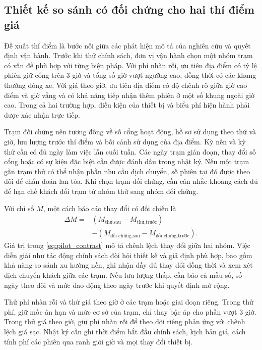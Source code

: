 \documentclass[conference,a4paper]{IEEEtran}
\begin{document}
\subsection{Thiết kế so sánh có đối chứng cho hai thí điểm giá}

Đề xuất thí điểm là bước nối giữa các phát hiện mô tả của nghiên cứu và quyết định vận hành. Trước khi thử chính sách, đơn vị vận hành chọn một nhóm trạm có vấn đề phù hợp với từng biện pháp. Với phí nhàn rỗi, ưu tiên địa điểm có tỷ lệ phiên giữ cổng trên 3 giờ và tổng số giờ vượt ngưỡng cao, đồng thời có các khung thường đông xe. Với giá theo giờ, ưu tiên địa điểm có độ chênh rõ giữa giờ cao điểm và giờ vắng và có khả năng tiếp nhận thêm phiên ở một số khung ngoài giờ cao. Trong cả hai trường hợp, điều kiện của thiết bị và biểu phí hiện hành phải được xác nhận trực tiếp.

Trạm đối chứng nên tương đồng về số cổng hoạt động, hồ sơ sử dụng theo thứ và giờ, lưu lượng trước thí điểm và bối cảnh sử dụng của địa điểm. Kỳ nền và kỳ thử cần có đủ ngày làm việc lẫn cuối tuần. Các ngày trạm gián đoạn, thay đổi số cổng hoặc có sự kiện đặc biệt cần được đánh dấu trong nhật ký. Nếu một trạm gần trạm thử có thể nhận phần nhu cầu dịch chuyển, số phiên tại đó được theo dõi để chẩn đoán lan tỏa. Khi chọn trạm đối chứng, cần cân nhắc khoảng cách đủ để hạn chế khách đổi trạm từ nhóm thử sang nhóm đối chứng.

Với chỉ số $M$, một cách báo cáo thay đổi có đối chiếu là
\begin{equation}
\begin{aligned}
\Delta M={}&(M_{\text{thử,sau}}-M_{\text{thử,trước}})\\
 &-(M_{\text{đối chứng,sau}}-M_{\text{đối chứng,trước}}).
\end{aligned}
\label{eq:pilot_contrast}
\end{equation}
Giá trị trong \eqref{eq:pilot_contrast} mô tả chênh lệch thay đổi giữa hai nhóm. Việc diễn giải như tác động chính sách đòi hỏi thiết kế và giả định phù hợp, bao gồm khả năng so sánh xu hướng nền, ghi nhận đầy đủ thay đổi đồng thời và xem xét dịch chuyển khách giữa các trạm. Nếu lưu lượng thấp, cần báo cả mẫu số, số ngày theo dõi và mức dao động theo ngày trước khi quyết định mở rộng.

Thử phí nhàn rỗi và thử giá theo giờ ở các trạm hoặc giai đoạn riêng. Trong thử phí, giữ mốc ân hạn và mức cơ sở của trạm, chỉ thay bậc áp cho phần vượt 3 giờ. Trong thử giá theo giờ, giữ phí nhàn rỗi để theo dõi riêng phản ứng với chênh lệch giá sạc. Nhật ký cần ghi thời điểm bắt đầu chính sách, kịch bản giá, cách tính phí các phiên qua ranh giới giờ và mọi thay đổi thiết bị.
\end{document}
